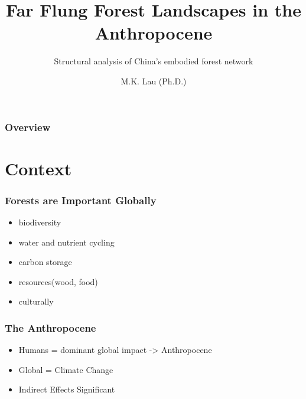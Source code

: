 \documentclass[aspectratio=169]{beamer}
\title{Far Flung Forest Landscapes in the Anthropocene}
\subtitle{Structural analysis of China's embodied forest network}
\author{M.K. Lau (Ph.D.)}
\institute{Chinese Academy of Sciences and Harvard University}
\begin{document}
\begin{frame}
  \titlepage
\end{frame}


\begin{frame}
  \frametitle{Overview}

\tableofcontents


\end{frame}


\section{Context}

\begin{frame}
  \frametitle{Forests are Important Globally}

  \begin{itemize}
  \item biodiversity
  \item water and nutrient cycling
  \item carbon storage
  \item resources(wood, food)
  \item culturally
  \end{itemize}

\end{frame}

\begin{frame}
  \frametitle{The Anthropocene}


  \begin{itemize}
  \item Humans = dominant global impact -> Anthropocene
  \item Global = Climate Change
  \item Indirect Effects Significant
  \end{itemize}


\end{frame}
\end{document}

